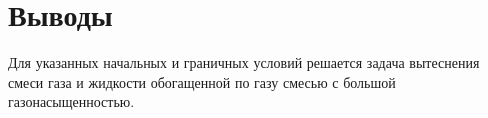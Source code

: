 \section{Выводы}

\begin{frame}
Для указанных начальных и граничных условий решается
задача вытеснения смеси газа и жидкости обогащенной по газу
смесью с большой газонасыщенностью.
\end{frame}
